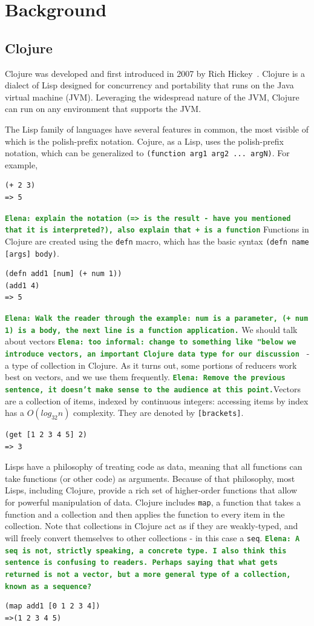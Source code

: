 \documentclass[12pt]{article}
\newcommand{\comment}[1]{{\bf \tt  {#1}}}
\newcommand{\emcomment}[1]{\textcolor{ForestGreen}{\comment{Elena: {#1}}}}
\newcommand{\clocode}[1]{{\texttt {#1}}}
\begin{document}
\section{Background}\label{sec:background}

\subsection{Clojure}\label{sec:clojure}
Clojure was developed and first introduced in 2007 by Rich Hickey~\cite{Hickey:2008}. Clojure is a dialect of Lisp designed for concurrency and portability that runs on the Java virtual machine (JVM). Leveraging the widespread nature of the JVM, Clojure can run on any environment that supports the JVM. 

The Lisp family of languages have several features in common, the most visible of which is the polish-prefix notation. Cojure, as a Lisp, uses the polish-prefix notation, which can be generalized to \clocode{(function arg1 arg2 ... argN)}. For example, 
\begin{verbatim}
(+ 2 3)
=> 5
\end{verbatim}
\emcomment{explain the notation (=> is the result - have you mentioned that it is interpreted?), also explain that + is a function}
Functions in Clojure are created using the \clocode{defn} macro, which has the basic syntax \clocode{(defn name [args] body)}.
\begin{verbatim}
(defn add1 [num] (+ num 1))
(add1 4)
=> 5
\end{verbatim} 
\emcomment{Walk the reader through the example: num is a parameter, (+ num 1) is a body, the next line is a function application.}
We should talk about vectors \emcomment{too informal: change to something like "below we introduce vectors, an important Clojure data type for our discussion } - a type of collection in Clojure. As it turns out, some portions of reducers work best on vectors, and we use them frequently. \emcomment{Remove the previous sentence, it doesn't make sense to the audience at this point.}Vectors are a collection of items, indexed by continuous integers: accessing items by index has a $O(log_{32}n)$  complexity. They are denoted by \clocode{[brackets]}.
\begin{verbatim}
(get [1 2 3 4 5] 2)
=> 3
\end{verbatim}
Lisps have a philosophy of treating code as data, meaning that all functions can take functions (or other code) as arguments. Because of that philosophy, most Lisps, including Clojure, provide a rich set of higher-order functions that allow for powerful manipulation of data. Clojure includes \clocode{map}, a function that takes a function and a collection and then applies the function to every item in the collection. Note that collections in Clojure act as if they are weakly-typed, and will freely convert themselves to other collections - in this case a \clocode{seq}.
\emcomment{A seq is not, strictly speaking, a concrete type. I also think this sentence is confusing to readers. Perhaps saying that what gets returned is not a vector, but a more general type of a collection, known as a sequence?}
\begin{verbatim}
(map add1 [0 1 2 3 4])
=>(1 2 3 4 5)
\end{verbatim}
\end{document}
